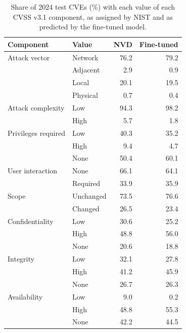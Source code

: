 \begin{table}[t]
\centering
\caption{Share of 2024 test CVEs (\%) with each value of each CVSS v3.1 component, as assigned by NIST and as predicted by the fine-tuned model.}
\label{tab:valuefreq}
\small
\begin{tabular}{llrr}
\toprule
Component & Value & NVD & Fine-tuned \\
\midrule
Attack vector & Network & 76.2 & 79.2 \\
 & Adjacent & 2.9 & 0.9 \\
 & Local & 20.1 & 19.5 \\
 & Physical & 0.7 & 0.4 \\
\addlinespace[2pt]
Attack complexity & Low & 94.3 & 98.2 \\
 & High & 5.7 & 1.8 \\
\addlinespace[2pt]
Privileges required & Low & 40.3 & 35.2 \\
 & High & 9.4 & 4.7 \\
 & None & 50.4 & 60.1 \\
\addlinespace[2pt]
User interaction & None & 66.1 & 64.1 \\
 & Required & 33.9 & 35.9 \\
\addlinespace[2pt]
Scope & Unchanged & 73.5 & 76.6 \\
 & Changed & 26.5 & 23.4 \\
\addlinespace[2pt]
Confidentiality & Low & 30.6 & 25.2 \\
 & High & 48.8 & 56.0 \\
 & None & 20.6 & 18.8 \\
\addlinespace[2pt]
Integrity & Low & 32.1 & 27.8 \\
 & High & 41.2 & 45.9 \\
 & None & 26.7 & 26.3 \\
\addlinespace[2pt]
Availability & Low & 9.0 & 0.2 \\
 & High & 48.8 & 55.3 \\
 & None & 42.2 & 44.5 \\
\bottomrule
\end{tabular}
\end{table}
